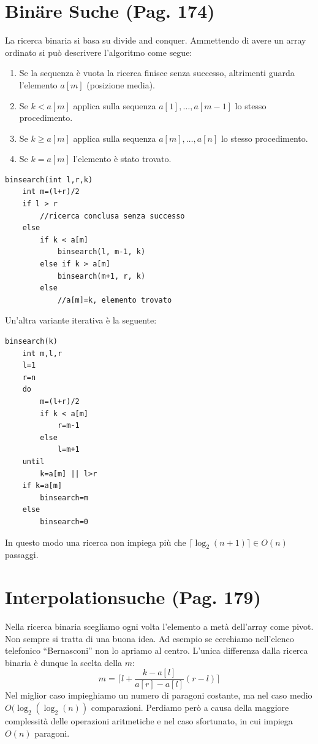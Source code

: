 \documentclass[a4paper]{book}
\newcommand{\lstIndent}{4}
\begin{document}
\section{Binäre Suche (Pag. 174)}
La ricerca binaria si basa su divide and conquer. Ammettendo di avere un array ordinato si può descrivere l'algoritmo come segue:
\begin{enumerate}
\item Se la sequenza è vuota la ricerca finisce senza successo, altrimenti guarda l'elemento $a[m]$ (posizione media).
\item Se $k < a[m]$ applica sulla sequenza $a[1],\dots, a[m-1]$ lo stesso procedimento.
\item Se $k \geq a[m]$ applica sulla sequenza $a[m],\dots, a[n]$ lo stesso procedimento.
\item Se $k = a[m]$ l'elemento è stato trovato.
\end{enumerate}
\begin{lstlisting}[tabsize=\lstIndent]
binsearch(int l,r,k)
	int m=(l+r)/2
	if l > r
		//ricerca conclusa senza successo
	else
		if k < a[m]
			binsearch(l, m-1, k)
		else if k > a[m]
			binsearch(m+1, r, k)	
		else
			//a[m]=k, elemento trovato				
\end{lstlisting}
Un'altra variante iterativa è la seguente:
\begin{lstlisting}[tabsize=\lstIndent]
binsearch(k)
	int m,l,r
	l=1
	r=n
	do
		m=(l+r)/2
		if k < a[m]
			r=m-1
		else
			l=m+1
	until
		k=a[m] || l>r
	if k=a[m]
		binsearch=m
	else
		binsearch=0								
\end{lstlisting}
In questo modo una ricerca non impiega più che $\lceil \log_2(n+1) \rceil \in O(n) $ passaggi.
\section{Interpolationsuche (Pag. 179)}
Nella ricerca binaria scegliamo ogni volta l'elemento a metà dell'array come pivot. Non sempre si tratta di una buona idea. Ad esempio se cerchiamo nell'elenco telefonico ``Bernasconi'' non lo apriamo al centro. L'unica differenza dalla ricerca binaria è dunque la scelta della $m$:
$$m= \lceil l+ \frac{k-a[l]}{a[r]-a[l]}(r-l) \rceil$$
Nel miglior caso impieghiamo un numero di paragoni costante, ma nel caso medio $O(\log_2(\log_2(n))$ comparazioni. Perdiamo però a causa della maggiore complessità delle operazioni aritmetiche e nel caso sfortunato, in cui impiega $O(n)$ paragoni.
\end{document}

